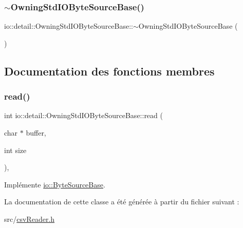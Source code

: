 \subsubsection{\texorpdfstring{$\sim$\+Owning\+Std\+I\+O\+Byte\+Source\+Base()}{~OwningStdIOByteSourceBase()}}
{\footnotesize\ttfamily io\+::detail\+::\+Owning\+Std\+I\+O\+Byte\+Source\+Base\+::$\sim$\+Owning\+Std\+I\+O\+Byte\+Source\+Base (\begin{DoxyParamCaption}{ }\end{DoxyParamCaption})\hspace{0.3cm}{\ttfamily [inline]}}



\subsection{Documentation des fonctions membres}
\mbox{\label{classio_1_1detail_1_1OwningStdIOByteSourceBase_a9269e7bfd07ebf2fa3518912fe7bebd0}} 
\subsubsection{\texorpdfstring{read()}{read()}}
{\footnotesize\ttfamily int io\+::detail\+::\+Owning\+Std\+I\+O\+Byte\+Source\+Base\+::read (\begin{DoxyParamCaption}\item[{char $\ast$}]{buffer,  }\item[{int}]{size }\end{DoxyParamCaption})\hspace{0.3cm}{\ttfamily [inline]}, {\ttfamily [virtual]}}



Implémente \hyperlink{classio_1_1ByteSourceBase_a9598bcc869b79e44da07f0e6fa478615}{io\+::\+Byte\+Source\+Base}.



La documentation de cette classe a été générée à partir du fichier suivant \+:\begin{DoxyCompactItemize}
\item 
src/\hyperlink{csvReader_8h}{csv\+Reader.\+h}\end{DoxyCompactItemize}

